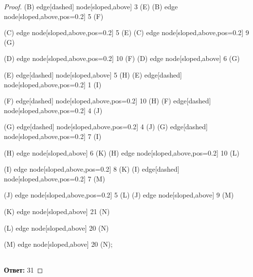 \begin{proof}
{    (B) edge[dashed] node[sloped,above] {3} (E)
    (B) edge node[sloped,above,pos=0.2] {5} (F)
    
    (C) edge node[sloped,above,pos=0.2] {5} (E)
    (C) edge node[sloped,above,pos=0.2] {9} (G)

    (D) edge node[sloped,above,pos=0.2] {10} (F)
    (D) edge node[sloped,above] {6} (G)
    
    (E) edge[dashed] node[sloped,above] {5} (H)
    (E) edge[dashed] node[sloped,above,pos=0.2] {1} (I)
    
    (F) edge[dashed] node[sloped,above,pos=0.2] {10} (H)
    (F) edge[dashed] node[sloped,above,pos=0.2] {4} (J)
    
    (G) edge[dashed] node[sloped,above,pos=0.2] {4} (J)
    (G) edge[dashed] node[sloped,above,pos=0.2] {7} (I)
    
    (H) edge node[sloped,above] {6} (K)
    (H) edge node[sloped,above,pos=0.2] {10} (L)
    
    (I) edge node[sloped,above,pos=0.2] {8} (K)
    (I) edge[dashed] node[sloped,above,pos=0.2] {7} (M)
    
    (J) edge node[sloped,above,pos=0.2] {5} (L)
    (J) edge node[sloped,above] {9} (M)
    
    (K) edge node[sloped,above] {21} (N)
    
    (L) edge node[sloped,above] {20} (N)
    
    (M) edge node[sloped,above] {20} (N);
    }\\
    \textbf{Ответ:} 31
\end{proof}